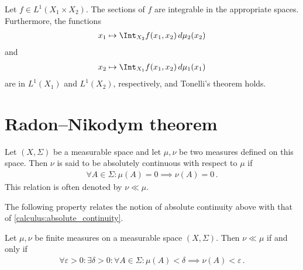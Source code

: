     \begin{result}[Fubini]
        Let $f\in L^1(X_1\times X_2)$. The sections of $f$ are integrable in the appropriate spaces. Furthermore, the functions
        \begin{gather}
            x_1\mapsto\Int_{X_2}f(x_1,x_2)\,d\mu_2(x_2)
        \end{gather}
        and
        \begin{gather}
            x_2\mapsto\Int_{X_1}f(x_1,x_2)\,d\mu_1(x_1)
        \end{gather}
        are in $L^1(X_1)$ and $L^1(X_2)$, respectively, and Tonelli's theorem holds.
    \end{result}

\section{Radon--Nikodym theorem}\label{section:Radon-Nikodym}

    \begin{definition}\label{measure:absolute_continuity}
        Let $(X,\Sigma)$ be a measurable space and let $\mu,\nu$ be two measures defined on this space. Then $\nu$ is said to be absolutely continuous with respect to $\mu$ if
        \begin{gather}
            \forall A\in\Sigma:\mu(A) = 0\implies\nu(A) = 0\,.
        \end{gather}
        This relation is often denoted by $\nu\ll\mu$.
    \end{definition}

    The following property relates the notion of absolute continuity above with that of \cref{calculus:absolute_continuity}.
    \begin{property}
        Let $\mu,\nu$ be finite measures on a measurable space $(X,\Sigma)$. Then $\nu\ll\mu$ if and only if
        \begin{gather}
            \forall\varepsilon>0:\exists\delta>0:\forall A\in\Sigma:\mu(A)<\delta\implies\nu(A)<\varepsilon\,.
        \end{gather}
    \end{property}

